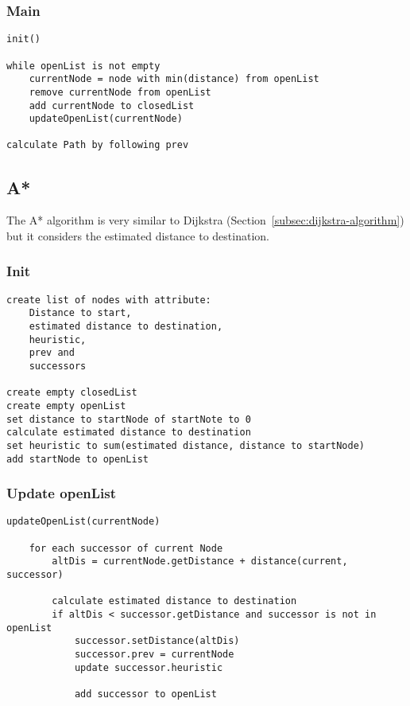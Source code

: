 \subsubsection*{Main}
\begin{lstlisting}[caption=Dijkstra Algorithm - Main, label=lst:DijkstraAlgorithmUpdateMain]
init()

while openList is not empty
    currentNode = node with min(distance) from openList
    remove currentNode from openList
    add currentNode to closedList
    updateOpenList(currentNode)

calculate Path by following prev
\end{lstlisting}

\subsection{A*}\label{subsec:a*}
The A* algorithm is very similar to Dijkstra (Section~\ref{subsec:dijkstra-algorithm}) but it considers the estimated distance to destination.

\subsubsection*{Init}
\begin{lstlisting}[caption=A* Algorithm - Init, label=lst:AStarAlgorithmInit]
create list of nodes with attribute:
    Distance to start,
    estimated distance to destination,
    heuristic,
    prev and
    successors

create empty closedList
create empty openList
set distance to startNode of startNote to 0
calculate estimated distance to destination
set heuristic to sum(estimated distance, distance to startNode)
add startNode to openList
\end{lstlisting}

\subsubsection*{Update openList}
\begin{lstlisting}[caption=A* Algorithm - Update openList, label=lst:AStarAlgorithmUpdateOpenList]
    updateOpenList(currentNode)

    for each successor of current Node
        altDis = currentNode.getDistance + distance(current, successor)

        calculate estimated distance to destination
        if altDis < successor.getDistance and successor is not in openList
            successor.setDistance(altDis)
            successor.prev = currentNode
            update successor.heuristic

            add successor to openList
\end{lstlisting}
\begin{lstlisting}[caption=A* Algorithm, language=matlab, label=lst:AStarAlgorithmInit]
\end{lstlisting}
